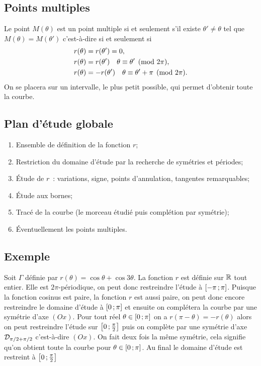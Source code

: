 \subsection{Points multiples}
Le point $M(\theta)$ est un point multiple si et seulement s'il existe $\theta' \neq \theta$ tel que $M(\theta)=M(\theta')$ c'est-à-dire si et seulement si
\begin{align}
 r(\theta)&=r(\theta')=0, \\
 r(\theta)&=r(\theta') \quad \theta \equiv \theta' \pmod {2\pi},\\
 r(\theta)&=-r(\theta') \quad \theta \equiv \theta'+\pi \pmod {2\pi}.
\end{align}
On se placera sur un intervalle, le plus petit possible, qui permet d'obtenir toute la courbe.
\subsection{Plan d'étude globale}
\begin{enumerate}
\item Ensemble de définition de la fonction $r$;
\item Restriction du domaine d'étude par la recherche de symétries et périodes;
\item Étude de $r$~: variations, signe, points d'annulation, tangentes remarquables;
\item Étude aux bornes;
\item Tracé de la courbe (le morceau étudié puis complétion par symétrie);
\item Éventuellement les points multiples.
\end{enumerate}

\subsection{Exemple}

Soit $\Gamma$ définie par $r(\theta)=\cos \theta + \cos 3\theta$. La fonction $r$ est définie sur $\mathbb{R}$ tout entier. Elle est $2\pi$-périodique, on peut donc restreindre l'étude à $\left[ -\pi \, ;  \pi \right]$. Puisque la fonction cosinus est paire, la fonction $r$ est aussi paire, on peut donc encore restreindre le domaine d'étude à $\left[ 0 \, ;  \pi \right]$ et ensuite on complétera la courbe par une symétrie d'axe $(Ox)$. Pour tout réel $\theta \in \left[ 0 \, ;  \pi \right]$ on a $r(\pi-\theta)=-r(\theta)$ alors on peut restreindre l'étude sur $\left[ 0 \, ;  \frac{\pi}{2} \right]$ puis on complète par une symétrie d'axe $\mathcal{D}_{\pi/2+\pi/2}$ c'est-à-dire $(Ox)$. On fait deux fois la même symétrie, cela signifie qu'on obtient toute la courbe pour $\theta \in \left[ 0 \, ;  \pi \right]$. Au final le domaine d'étude est restreint à $\left[ 0 \, ;  \frac{\pi}{2} \right]$


